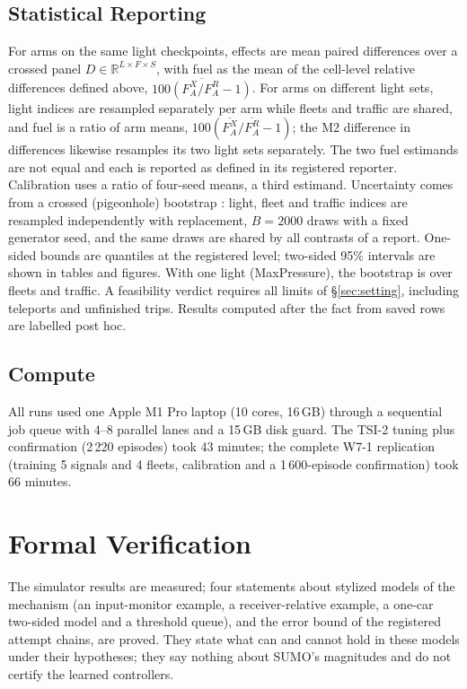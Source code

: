 \subsection{Statistical Reporting}\label{sec:stats}
For arms on the same light checkpoints, effects are mean paired differences over a crossed panel $D\in\mathbb R^{L\times F\times S}$,
with fuel as the mean of the cell-level relative differences defined above, $\overline{100(F_A^X/F_A^R-1)}$. For arms on different light
sets, light indices are resampled separately per arm while fleets and traffic are shared, and fuel is a ratio of arm means,
$100(\overline{F_A^X}/\overline{F_A^R}-1)$; the M2 difference in differences likewise resamples its two light sets separately. The two
fuel estimands are not equal and each is reported as defined in its registered reporter. Calibration uses a ratio of four-seed means, a
third estimand. Uncertainty
comes from a crossed (pigeonhole) bootstrap \cite{owen2007,efron1993}: light, fleet and traffic indices are resampled independently with
replacement, $B=2000$ draws with a fixed generator seed, and the same draws are shared by all contrasts of a report. One-sided bounds are
quantiles at the registered level; two-sided 95\% intervals are shown in tables and figures. With one light (MaxPressure), the bootstrap is
over fleets and traffic. A feasibility verdict requires all limits of §\ref{sec:setting}, including teleports and unfinished trips.
Results computed after the fact from saved rows are labelled post hoc.

\subsection{Compute}
All runs used one Apple M1 Pro laptop (10 cores, 16\,GB) through a sequential job queue with 4--8 parallel lanes and a 15\,GB disk guard.
The TSI-2 tuning plus confirmation (2\,220 episodes) took 43 minutes; the complete W7-1 replication (training 5 signals and 4 fleets,
calibration and a 1\,600-episode confirmation) took 66 minutes.

\section{Formal Verification}\label{sec:verification}
The simulator results are measured; four statements about stylized models of the mechanism (an input-monitor example, a
receiver-relative example, a one-car two-sided model and a threshold queue), and the error bound of the registered attempt chains, are
proved. They state what can and cannot hold in these models under their hypotheses; they say nothing about SUMO's magnitudes and do
not certify the learned controllers.

